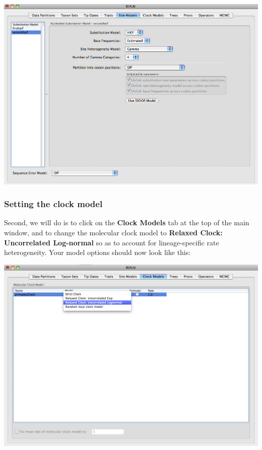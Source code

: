 \documentclass[12pt]{article}
\begin{document}
\medskip{}

\includegraphics[scale=0.4]{figures/BEAUti_Model}

\medskip{}


\subsubsection*{Setting the clock model}

Second, we will do is to click on the {\bf Clock Models} tab at the top of the
main window, and to change the molecular clock model to \textbf{Relaxed Clock: Uncorrelated
Log-normal} so as to account for lineage-specific rate heterogeneity.
Your model options should now look like this: 

\medskip{}

\includegraphics[scale=0.4]{figures/BEAUti_Clock}
\end{document}
